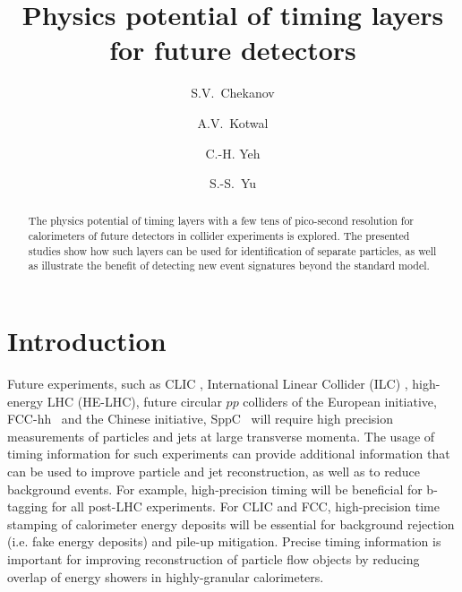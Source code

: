 \documentclass[final,1p,11pt]{elsarticle}
\begin{document}
\begin{frontmatter}

\title{
Physics potential of timing layers for future detectors}

\author[add1]{S.V.~Chekanov}

\author[addDuke]{A.V.~Kotwal}

\author[add3]{C.-H. Yeh}


\author[add3]{S.-S.~Yu}

\address[add1]{
HEP Division, Argonne National Laboratory,
9700 S.~Cass Avenue,
Argonne, IL 60439, USA.
}


\address[add3]{
Department of Physics and Center for High Energy and High Field Physics, 
National Central University, Chung-Li, Taoyuan City 32001, Taiwan
}

\address[addDuke]{
Department of Physics, Duke University, USA
}


\begin{abstract}
The physics potential of timing layers with a few tens of pico-second resolution for 
calorimeters of future detectors in collider experiments is explored.
The presented studies show how such layers can be used for identification 
of separate particles,  as well as illustrate the benefit of detecting  
new event signatures beyond  the standard model. 
\end{abstract}

\begin{keyword}

\end{keyword}
\end{frontmatter}



\section{Introduction}

Future experiments, such as CLIC \cite{Linssen:1425915}, International Linear Collider (ILC) \cite{Behnke:2013xla}, high-energy LHC (HE-LHC),
future circular $pp$ colliders of the European initiative, FCC-hh~\cite{Benedikt:2206376} and the Chinese initiative, SppC~\cite{Tang:2015qga} 
will require high precision measurements of particles and jets 
at large transverse momenta. 
The usage of timing information for such experiments  can  provide additional 
information that can be used to improve particle and jet reconstruction, as well as to reduce background events.
For example, high-precision timing will be beneficial for b-tagging for all post-LHC experiments. 
For CLIC and FCC, high-precision time stamping of calorimeter energy deposits will be essential for
background rejection (i.e. fake energy deposits) and pile-up mitigation.
Precise timing information is important for improving reconstruction of particle flow objects by reducing overlap 
of energy showers in highly-granular calorimeters.
\end{document}
